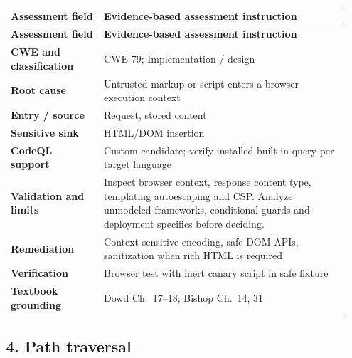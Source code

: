 \documentclass[11pt,letterpaper,oneside]{book}
\begin{document}
\small
\setlength{\tabcolsep}{2pt}
\renewcommand{\arraystretch}{1.18}
\begin{longtable}{>{\raggedright\arraybackslash}p{0.26\linewidth}>{\raggedright\arraybackslash}p{0.69\linewidth}}
\toprule
\textbf{Assessment field} & \textbf{Evidence-based assessment instruction}\\
\midrule
\endfirsthead
\toprule
\textbf{Assessment field} & \textbf{Evidence-based assessment instruction}\\
\midrule
\endhead
\textbf{CWE and classification} & CWE-79; Implementation / design\\
\textbf{Root cause} & Untrusted markup or script enters a browser execution context\\
\textbf{Entry / source} & Request, stored content\\
\textbf{Sensitive sink} & HTML/DOM insertion\\
\textbf{CodeQL support} & Custom candidate; verify installed built-in query per target language\\
\textbf{Validation and limits} & Inspect browser context, response content type, templating autoescaping and CSP. Analyze unmodeled frameworks, conditional guards and deployment specifics before deciding.\\
\textbf{Remediation} & Context-sensitive encoding, safe DOM APIs, sanitization when rich HTML is required\\
\textbf{Verification} & Browser test with inert canary script in safe fixture\\
\textbf{Textbook grounding} & Dowd Ch.~17--18; Bishop Ch.~14, 31\\
\bottomrule
\end{longtable}
\normalsize

\subsection{4. Path traversal}
\end{document}
